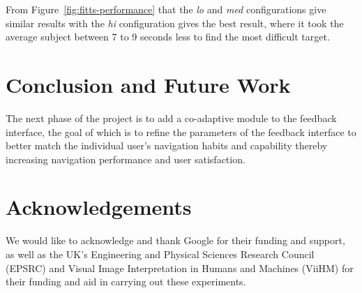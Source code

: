 \documentclass[format=sigconf, review=true, screen=true, anonymous=true]{acmart}
\begin{document}
From Figure~\ref{fig:fitts-performance} that the \emph{lo} and \emph{med} configurations give similar results with the \emph{hi} configuration gives the best result, where it took the average subject between 7 to 9 seconds less to find the most difficult target. 

\section{Conclusion and Future Work}
\label{sec:conclusion}

The next phase of the project is to add a co-adaptive module to the feedback interface, the goal of which is to refine the parameters of the feedback interface to better match the individual user's navigation habits and capability thereby increasing navigation performance and user satisfaction.

\section{Acknowledgements}
\label{sec:ack}

We would like to acknowledge and thank Google for their funding and support, as well as the UK's Engineering and Physical Sciences Research Council (EPSRC) and Visual Image Interpretation in Humans and Machines (ViiHM) for their funding and aid in carrying out these experiments. 



\end{document}
